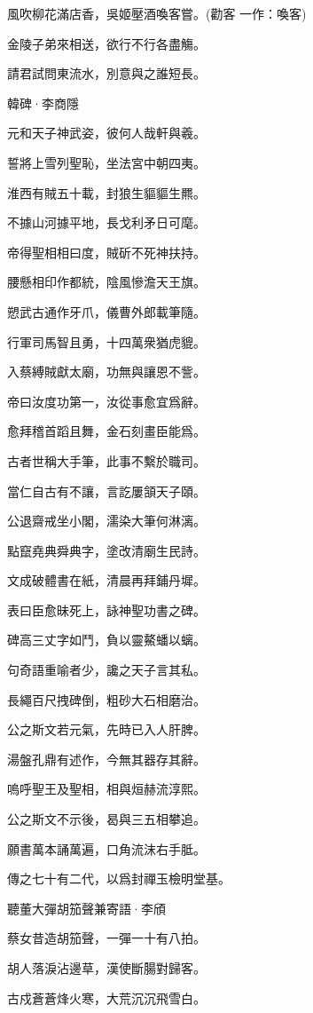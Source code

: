 \documentclass[12pt,a4paper]{ctexbook}
\begin{document}
風吹柳花滿店香，吳姬壓酒喚客嘗。(勸客 一作：喚客)\par
金陵子弟來相送，欲行不行各盡觴。\par
請君試問東流水，別意與之誰短長。\par
韓碑·李商隱\par
元和天子神武姿，彼何人哉軒與羲。\par
誓將上雪列聖恥，坐法宮中朝四夷。\par
淮西有賊五十載，封狼生貙貙生羆。\par
不據山河據平地，長戈利矛日可麾。\par
帝得聖相相曰度，賊斫不死神扶持。\par
腰懸相印作都統，陰風慘澹天王旗。\par
愬武古通作牙爪，儀曹外郎載筆隨。\par
行軍司馬智且勇，十四萬衆猶虎貔。\par
入蔡縛賊獻太廟，功無與讓恩不訾。\par
帝曰汝度功第一，汝從事愈宜爲辭。\par
愈拜稽首蹈且舞，金石刻畫臣能爲。\par
古者世稱大手筆，此事不繫於職司。\par
當仁自古有不讓，言訖屢頷天子頤。\par
公退齋戒坐小閣，濡染大筆何淋漓。\par
點竄堯典舜典字，塗改清廟生民詩。\par
文成破體書在紙，清晨再拜鋪丹墀。\par
表曰臣愈昧死上，詠神聖功書之碑。\par
碑高三丈字如鬥，負以靈鰲蟠以螭。\par
句奇語重喻者少，讒之天子言其私。\par
長繩百尺拽碑倒，粗砂大石相磨治。\par
公之斯文若元氣，先時已入人肝脾。\par
湯盤孔鼎有述作，今無其器存其辭。\par
嗚呼聖王及聖相，相與烜赫流淳熙。\par
公之斯文不示後，曷與三五相攀追。\par
願書萬本誦萬遍，口角流沫右手胝。\par
傳之七十有二代，以爲封禪玉檢明堂基。\par
聽董大彈胡笳聲兼寄語·李頎\par
蔡女昔造胡笳聲，一彈一十有八拍。\par
胡人落淚沾邊草，漢使斷腸對歸客。\par
古戍蒼蒼烽火寒，大荒沉沉飛雪白。\par
\end{document}
